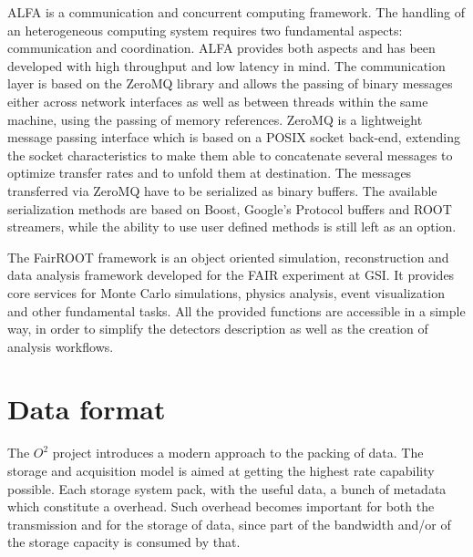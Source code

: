 ALFA is a communication and concurrent computing framework.
The handling of an heterogeneous computing system requires two fundamental aspects: communication and coordination.
ALFA provides both aspects and has been developed with high throughput and low latency in mind.
The communication layer is based on the ZeroMQ library and allows the passing of binary messages either across network interfaces as well as between threads within the same machine, using the passing of memory references.
ZeroMQ is a lightweight message passing interface which is based on a POSIX socket back-end, extending the socket characteristics to make them able to concatenate several messages to optimize transfer rates and to unfold them at destination.
The messages transferred via ZeroMQ have to be serialized as binary buffers.
The available serialization methods are based on Boost, Google's Protocol buffers and ROOT streamers, while the ability to use user defined methods is still left as an option.

The FairROOT framework is an object oriented simulation, reconstruction and data analysis framework  developed for the FAIR experiment at GSI.
It provides core services for Monte Carlo simulations, physics analysis, event visualization and other fundamental tasks.
All the provided functions are accessible in a simple way, in order to simplify the detectors description as well as the creation of analysis workflows.

\section{Data format}
The $O^2$ project introduces a modern approach to the packing of data.
The storage and acquisition model is aimed at getting the highest rate capability possible.
Each storage system pack, with the useful data, a bunch of metadata which constitute a overhead.
Such overhead becomes important for both the transmission and for the storage of data, since part of the bandwidth and/or of the storage capacity is consumed by that.

